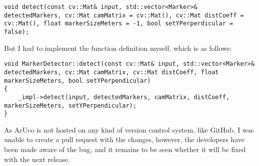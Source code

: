 \begin{lstlisting}[style=cpp,caption={Declaration of function in ArUco markerdetector.h}]
void detect(const cv::Mat& input, std::vector<Marker>& detectedMarkers, cv::Mat camMatrix = cv::Mat(), cv::Mat distCoeff = cv::Mat(), float markerSizeMeters = -1, bool setYPerperdicular = false);
\end{lstlisting}

But I had to implement the function definition myself, which is as follows:

\begin{lstlisting}[style=cpp,caption={Added function definition}]
void MarkerDetector::detect(const cv::Mat& input, std::vector<Marker>& detectedMarkers, cv::Mat camMatrix, cv::Mat distCoeff, float markerSizeMeters, bool setYPerpendicular)
{
    _impl->detect(input, detectedMarkers, camMatrix, distCoeff, markerSizeMeters, setYPerpendicular);
}
\end{lstlisting}

As ArUco is not hosted on any kind of version control system, like GitHub, I was unable to create a pull request with the changes, however, the developers have been made aware of the bug, and it remains to be seen whether it will be fixed with the next release.